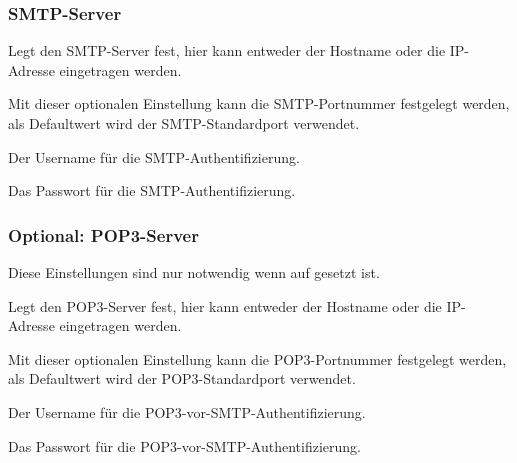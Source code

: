 \subsubsection {SMTP-Server}
\begin {description}

    
    Legt den SMTP-Server fest, hier kann entweder der Hostname oder
    die IP-Adresse eingetragen werden.
            
    
    Mit dieser optionalen Einstellung kann die SMTP-Portnummer festgelegt
    werden, als Defaultwert wird der SMTP-Standardport  verwendet.
    
    
    Der Username für die SMTP-Authentifizierung.
                
    
    Das Passwort für die SMTP-Authentifizierung.

\end {description}

\subsubsection {Optional: POP3-Server}

    Diese Einstellungen sind nur notwendig wenn 
     auf  gesetzt ist. 

\begin {description}

    Legt den POP3-Server fest, hier kann entweder der Hostname oder
    die IP-Adresse eingetragen werden.
            
    
    Mit dieser optionalen Einstellung kann die POP3-Portnummer festgelegt
    werden, als Defaultwert wird der POP3-Standardport  verwendet.

    
    Der Username für die POP3-vor-SMTP-Authentifizierung.
    
    
    Das Passwort für die POP3-vor-SMTP-Authentifizierung.

\end {description}

